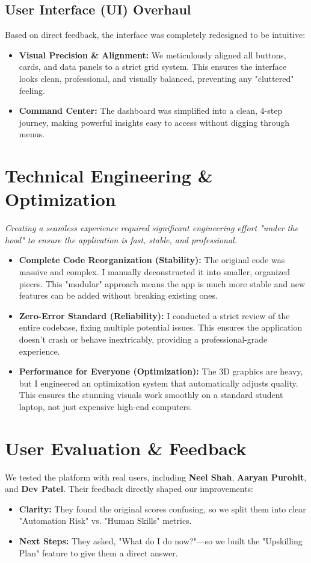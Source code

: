 \documentclass[11pt, letterpaper]{article}
\begin{document}
\subsection{User Interface (UI) Overhaul}
Based on direct feedback, the interface was completely redesigned to be intuitive:
\begin{itemize}
    \item \textbf{Visual Precision \& Alignment:} We meticulously aligned all buttons, cards, and data panels to a strict grid system. This ensures the interface looks clean, professional, and visually balanced, preventing any "cluttered" feeling.
    \item \textbf{Command Center:} The dashboard was simplified into a clean, 4-step journey, making powerful insights easy to access without digging through menus.
\end{itemize}

\section{Technical Engineering \& Optimization}
\textit{Creating a seamless experience required significant engineering effort "under the hood" to ensure the application is fast, stable, and professional.}

\begin{itemize}
    \item \textbf{Complete Code Reorganization (Stability):} The original code was massive and complex. I manually deconstructed it into smaller, organized pieces. This "modular" approach means the app is much more stable and new features can be added without breaking existing ones.
    \item \textbf{Zero-Error Standard (Reliability):} I conducted a strict review of the entire codebase, fixing multiple potential issues. This ensures the application doesn't crash or behave inextricably, providing a professional-grade experience.
    \item \textbf{Performance for Everyone (Optimization):} The 3D graphics are heavy, but I engineered an optimization system that automatically adjusts quality. This ensures the stunning visuals work smoothly on a standard student laptop, not just expensive high-end computers.
\end{itemize}

\section{User Evaluation \& Feedback}
We tested the platform with real users, including \textbf{Neel Shah}, \textbf{Aaryan Purohit}, and \textbf{Dev Patel}. Their feedback directly shaped our improvements:
\begin{itemize}
    \item \textbf{Clarity:} They found the original scores confusing, so we split them into clear "Automation Risk" vs. "Human Skills" metrics.
    \item \textbf{Next Steps:} They asked, "What do I do now?"—so we built the "Upskilling Plan" feature to give them a direct answer.
\end{itemize}
\end{document}
